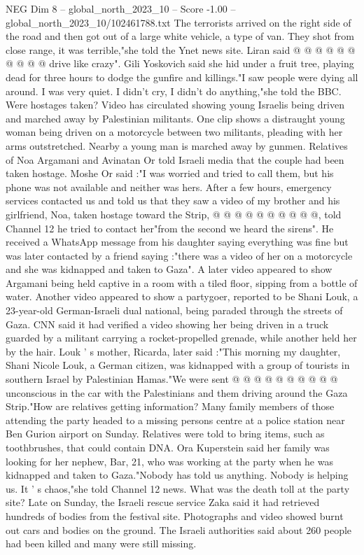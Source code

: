 \begin{textsample}{NEG Dim 8 – global\_north\_2023\_10 – Score -1.00 – global\_north\_2023\_10/102461788.txt}
The terrorists arrived on the right side of the road and then got out of a large white vehicle, a type of van.
They shot from close range, it was terrible,"she told the Ynet news site.
Liran said @ @ @ @ @ @ @ @ @ @ drive like crazy".
Gili Yoskovich said she hid under a fruit tree, playing dead for three hours to dodge the gunfire and killings."I saw people were dying all around.
I was very quiet.
I didn't cry, I didn't do anything,"she told the BBC.
Were hostages taken?
Video has circulated showing young Israelis being driven and marched away by Palestinian militants.
One clip shows a distraught young woman being driven on a motorcycle between two militants, pleading with her arms outstretched.
Nearby a young man is marched away by gunmen.
Relatives of Noa Argamani and Avinatan Or told Israeli media that the couple had been taken hostage.
Moshe Or said :"I was worried and tried to call them, but his phone was not available and neither was hers.
After a few hours, emergency services contacted us and told us that they saw a video of my brother and his girlfriend, Noa, taken hostage toward the Strip, @ @ @ @ @ @ @ @ @ @, told Channel 12 he tried to contact her"from the second we heard the sirens".
He received a WhatsApp message from his daughter saying everything was fine but was later contacted by a friend saying :"there was a video of her on a motorcycle and she was kidnapped and taken to Gaza".
A later video appeared to show Argamani being held captive in a room with a tiled floor, sipping from a bottle of water.
Another video appeared to show a partygoer, reported to be Shani Louk, a 23-year-old German-Israeli dual national, being paraded through the streets of Gaza.
CNN said it had verified a video showing her being driven in a truck guarded by a militant carrying a rocket-propelled grenade, while another held her by the hair.
Louk ' s mother, Ricarda, later said :"This morning my daughter, Shani Nicole Louk, a German citizen, was kidnapped with a group of tourists in southern Israel by Palestinian Hamas."We were sent @ @ @ @ @ @ @ @ @ @ unconscious in the car with the Palestinians and them driving around the Gaza Strip."How are relatives getting information?
Many family members of those attending the party headed to a missing persons centre at a police station near Ben Gurion airport on Sunday.
Relatives were told to bring items, such as toothbrushes, that could contain DNA.
Ora Kuperstein said her family was looking for her nephew, Bar, 21, who was working at the party when he was kidnapped and taken to Gaza."Nobody has told us anything.
Nobody is helping us.
It ' s chaos,"she told Channel 12 news.
What was the death toll at the party site?
Late on Sunday, the Israeli rescue service Zaka said it had retrieved hundreds of bodies from the festival site.
Photographs and video showed burnt out cars and bodies on the ground.
The Israeli authorities said about 260 people had been killed and many were still missing.

\end{textsample}
